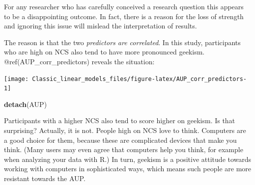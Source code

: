 \documentclass[]{svmono}
\newenvironment{Shaded}{\begin{snugshade}}{\end{snugshade}}
\newcommand{\KeywordTok}[1]{\textcolor[rgb]{0.13,0.29,0.53}{\textbf{#1}}}
\newcommand{\DataTypeTok}[1]{\textcolor[rgb]{0.13,0.29,0.53}{#1}}
\newcommand{\DecValTok}[1]{\textcolor[rgb]{0.00,0.00,0.81}{#1}}
\newcommand{\StringTok}[1]{\textcolor[rgb]{0.31,0.60,0.02}{#1}}
\newcommand{\OperatorTok}[1]{\textcolor[rgb]{0.81,0.36,0.00}{\textbf{#1}}}
\newcommand{\NormalTok}[1]{#1}
\begin{document}
For any researcher who has carefully conceived a research question this
appears to be a disappointing outcome. In fact, there is a reason for
the loss of strength and ignoring this issue will mislead the
interpretation of results.

The reason is that the two \emph{predictors are correlated}. In this
study, participants who are high on NCS also tend to have more
pronounced geekism. @ref(AUP\_corr\_predictors) reveals the situation:

\begin{Shaded}
\end{Shaded}

\texttt{[image: Classic\_linear\_models\_files/figure-latex/AUP\_corr\_predictors-1]}

\begin{Shaded}
\begin{Highlighting}[]
\KeywordTok{detach}\NormalTok{(AUP)}
\end{Highlighting}
\end{Shaded}

Participants with a higher NCS also tend to score higher on geekism. Is
that surprising? Actually, it is not. People high on NCS love to think.
Computers are a good choice for them, because these are complicated
devices that make you think. (Many users may even agree that computers
help you think, for example when analyzing your data with R.) In turn,
geekism is a positive attitude towards working with computers in
sophisticated ways, which means such people are more resistant towards
the AUP.
\end{document}
